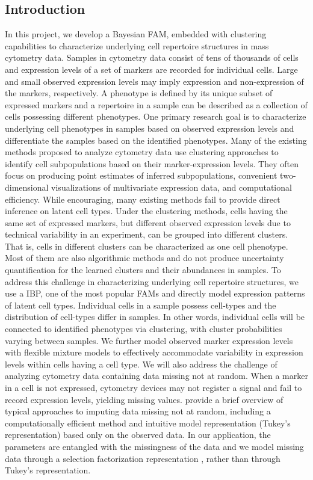 \documentclass[12pt,]{article}
\begin{document}
\subsection{Introduction}

In this project, we develop a Bayesian FAM, embedded with clustering
capabilities to characterize underlying cell repertoire structures in mass
cytometry data.  Samples in cytometry data consist of tens of thousands of
cells and expression levels of a set of markers are recorded for individual
cells. Large and small observed expression levels may imply expression and
non-expression of the markers, respectively.  A phenotype is defined by its
unique subset of expressed markers and a repertoire in a sample can be
described as a collection of cells possessing different phenotypes.  One
primary research goal is to characterize underlying cell phenotypes in samples
based on observed expression levels and differentiate the samples based on the
identified phenotypes.  Many of the existing methods proposed to analyze
cytometry data use clustering approaches to identify cell subpopulations based
on their marker-expression levels.  They often focus on producing point
estimates of inferred subpopulations, convenient two-dimensional visualizations
of multivariate expression data, and computational efficiency.  While
encouraging, many existing methods fail to provide direct inference on latent
cell types.  Under the clustering methods, cells having the same set of
expressed markers, but different observed expression levels due to technical
variability in an experiment, can be grouped into different clusters.  That is,
cells in different clusters can be characterized as one cell phenotype.  Most
of them are also algorithmic methods and do not produce uncertainty
quantification for the learned clusters and their abundances in samples.  To
address this challenge in characterizing underlying cell repertoire structures,
we use a IBP, one of the most popular FAMs and directly model expression
patterns of latent cell types.  Individual cells in a sample possess cell-types
and the distribution of cell-types differ in samples. In other words, individual
cells will be connected to identified phenotypes via clustering, with
cluster probabilities varying between samples.  We further model observed
marker expression levels with flexible mixture models to effectively
accommodate variability in expression levels within cells having a cell type.
We will also address the challenge of analyzing cytometry data containing data
missing not at random.  When a marker in a cell is not expressed, cytometry
devices may not register a signal and fail to record expression levels,
yielding missing values.  \cite{franks2016non} provide a brief overview of
typical approaches to imputing data missing not at random, including a
computationally efficient method and intuitive model representation (Tukey's
representation) based only on the observed data.  In our application, the
parameters are entangled with the missingness of the data and we model missing
data through a selection factorization representation
\citep{rubin1974characterizing}, rather than through Tukey's representation. 
\end{document}
